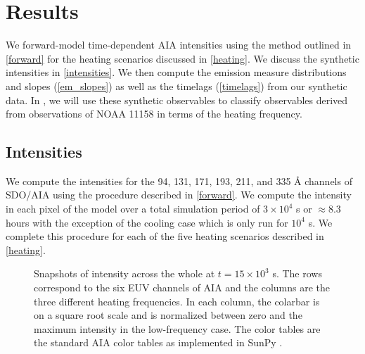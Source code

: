 \section{Results}\label{results}

We forward-model time-dependent AIA intensities using the method outlined in \autoref{forward} for the heating scenarios discussed in \autoref{heating}. We discuss the synthetic intensities in \autoref{intensities}. We then compute the emission measure distributions and slopes (\autoref{em_slopes}) as well as the timelags (\autoref{timelags}) from our synthetic data. In , we will use these synthetic observables to classify observables derived from observations of NOAA 11158 in terms of the heating frequency.

\subsection{Intensities}\label{intensities}

We compute the intensities for the 94, 131, 171, 193, 211, and 335 \AA{} channels of SDO/AIA using the procedure described in \autoref{forward}. We compute the intensity in each pixel of the model \AR{} over a total simulation period of $3\times10^4$ s or $\approx8.3$ hours with the exception of the cooling case which is only run for $10^4$ s. We complete this procedure for each of the five heating scenarios described in \autoref{heating}. 

\begin{figure*}
    \caption{Snapshots of intensity across the whole \AR{} at $t=15\times10^3$ s. The rows correspond to the six EUV channels of AIA and the columns are the three different heating frequencies. In each column, the colarbar is on a square root scale and is normalized between zero and the maximum intensity in the low-frequency case. The color tables are the standard AIA color tables as implemented in SunPy \citep{sunpy_community_sunpypython_2015}.}
    \label{fig:intensity_map}
\end{figure*}

